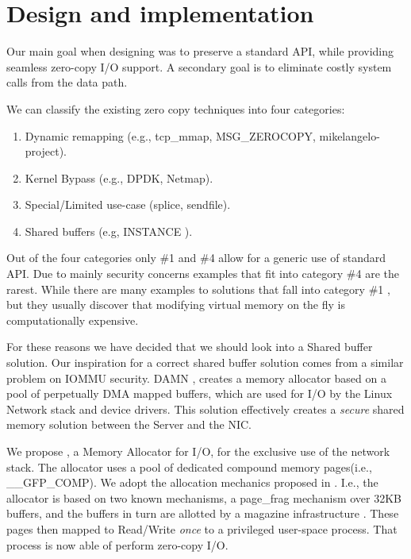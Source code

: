 
\section{Design and implementation}
Our main goal when designing \oursys was to preserve a standard \sockets API, while providing seamless zero-copy I/O support. A secondary goal is to eliminate costly system calls from the data path. 

We can classify the existing zero copy techniques into four categories:
\begin{enumerate}
    \item Dynamic remapping (e.g., tcp\_mmap, MSG\_ZEROCOPY\cite{desendmsg}, mikelangelo-project\cite{mikelangelo}).
    \item Kernel Bypass (e.g., DPDK, Netmap\cite{rizzo2012netmap}).
    \item Special/Limited use-case (splice, sendfile).
    \item Shared buffers (e.g, INSTANCE \cite{instance}).
\end{enumerate}
Out of the four categories only \#1 and \#4 allow for a generic use of standard \sockets API. Due to mainly security concerns examples that fit into category \#4 are the rarest.
While there are many examples to solutions that fall into category \#1 \cite{mikelangelo-empty,desendmsg}, but they usually discover that modifying virtual memory on the fly is computationally expensive. 

For these reasons we have decided that we should look into a Shared buffer solution. Our inspiration for a correct shared buffer solution comes from a similar problem on IOMMU security. DAMN \cite{markuze2018damn}, creates a memory allocator based on a pool of perpetually DMA mapped buffers, which are used for I/O by the Linux Network stack and device drivers. This solution effectively creates a \emph{secure} shared memory solution between the Server and the NIC.

We propose \oursys, a Memory Allocator for I/O, for the  exclusive use of the network stack. The \oursys allocator uses a pool of dedicated compound memory pages(i.e., \_\_GFP\_COMP). We adopt the allocation mechanics proposed in \cite{markuze2018damn}. I.e., the allocator is based on two known mechanisms, a page\_frag mechanism \cite{pagefrag} over 32KB buffers, and the buffers in turn are allotted by a magazine infrastructure \cite{bonwick2001magazines}. These pages then mapped to Read/Write \emph{once} to a privileged user-space process. That process is now able of perform zero-copy I/O.

